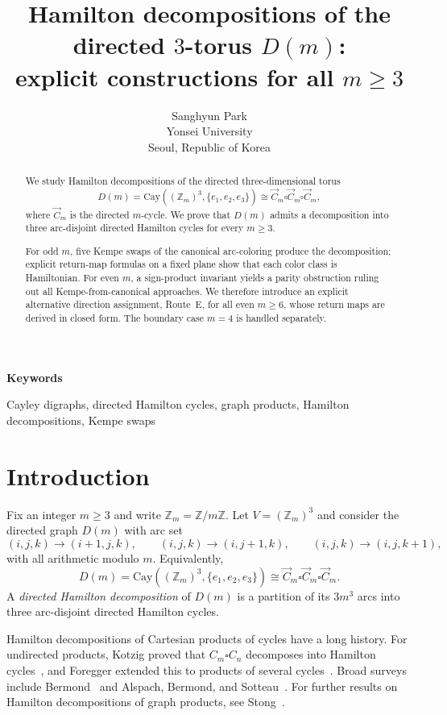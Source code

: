 \documentclass[11pt]{article}
\title{Hamilton decompositions of the directed $3$-torus $D(m)$:\\
explicit constructions for all $m\ge 3$}
\author{Sanghyun Park\\ Yonsei University\\ Seoul, Republic of Korea}
\date{}
\newcommand{\keywordline}[1]{\par\noindent\textbf{Keywords}\par\noindent #1\par}
\begin{document}
\maketitle

\begin{abstract}
We study Hamilton decompositions of the directed three-dimensional torus
\[
D(m)=\mathrm{Cay}((\mathbb Z_m)^3,\{e_1,e_2,e_3\})\cong \vec C_m\square \vec C_m\square \vec C_m,
\]
where $\vec C_m$ is the directed $m$-cycle.
We prove that $D(m)$ admits a decomposition into three arc-disjoint directed Hamilton cycles for every $m\ge 3$.

For odd $m$, five Kempe swaps of the canonical arc-coloring produce the decomposition; explicit return-map formulas on a fixed plane show that each color class is Hamiltonian.
For even $m$, a sign-product invariant yields a parity obstruction ruling out all Kempe-from-canonical approaches.
We therefore introduce an explicit alternative direction assignment, Route~E, for all even $m\ge 6$, whose return maps are derived in closed form.
The boundary case $m=4$ is handled separately.
\end{abstract}
\keywordline{Cayley digraphs, directed Hamilton cycles, graph products, Hamilton decompositions, Kempe swaps}


\section{Introduction}

Fix an integer $m\ge 3$ and write $\mathbb Z_m=\mathbb Z/m\mathbb Z$.
Let $V=(\mathbb Z_m)^3$ and consider the directed graph $D(m)$ with arc set
\[
(i,j,k)\to(i+1,j,k),\qquad (i,j,k)\to(i,j+1,k),\qquad (i,j,k)\to(i,j,k+1),
\]
with all arithmetic modulo $m$.
Equivalently,
\[
D(m)=\mathrm{Cay}((\mathbb Z_m)^3,\{e_1,e_2,e_3\})\cong \vec C_m\square \vec C_m\square \vec C_m.
\]
A \emph{directed Hamilton decomposition} of $D(m)$ is a partition of its $3m^3$ arcs into three arc-disjoint directed Hamilton cycles.

Hamilton decompositions of Cartesian products of cycles have a long history.
For undirected products, Kotzig proved that $C_m\square C_n$ decomposes into Hamilton cycles~\cite{Kotzig1973}, and Foregger extended this to products of several cycles~\cite{Foregger1978}.
Broad surveys include Bermond~\cite{Bermond1978} and Alspach, Bermond, and Sotteau~\cite{AlspachBermondSotteau1990}.
For further results on Hamilton decompositions of graph products, see Stong~\cite{Stong1991}.
\end{document}
